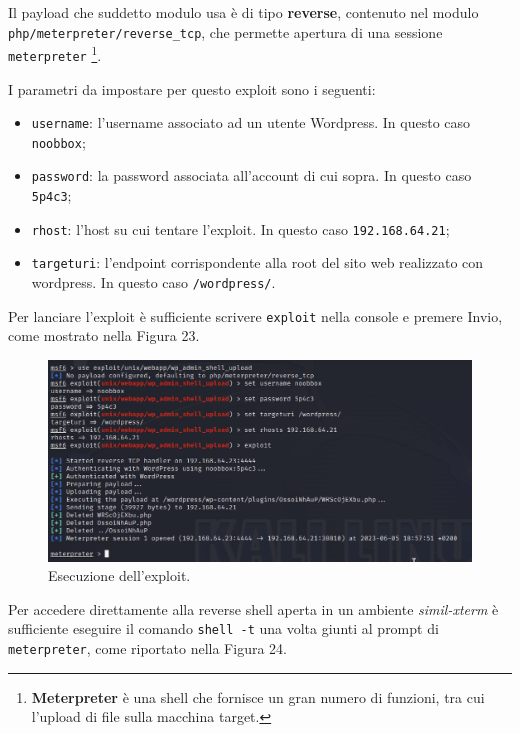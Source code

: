 \documentclass[a4paper, 12pt, oneside]{article}
\begin{document}
Il payload che suddetto modulo usa è di tipo \textbf{reverse}, contenuto nel modulo \texttt{php/meterpreter/reverse\_tcp}, che permette apertura di una sessione \texttt{meterpreter} \footnote{\textbf{Meterpreter} è una shell che fornisce un gran numero di funzioni, tra cui l'upload di file sulla macchina target.\cite{meterpreter}}.

I parametri da impostare per questo exploit sono i seguenti:

\begin{itemize}
    \item \texttt{username}: l'username associato ad un utente Wordpress. In questo caso \texttt{noobbox};
    \item \texttt{password}: la password associata all'account di cui sopra. In questo caso \texttt{5p4c3};
    \item \texttt{rhost}: l'host su cui tentare l'exploit. In questo caso \texttt{192.168.64.21};
    \item \texttt{targeturi}: l'endpoint corrispondente alla root del sito web realizzato con wordpress. In questo caso \texttt{/wordpress/}.
\end{itemize}

Per lanciare l'exploit è sufficiente scrivere \texttt{exploit} nella console e premere Invio, come mostrato nella Figura 23.

\begin{figure}[h!]
    \centering
    \includegraphics[width=\textwidth]{img/metaspolit_exploit.png}
    \caption{Esecuzione dell'exploit.}
\end{figure}

\newpage

Per accedere direttamente alla reverse shell aperta in un ambiente \textit{simil-xterm} è sufficiente eseguire il comando \texttt{shell -t} una volta giunti al prompt di \texttt{meterpreter}, come riportato nella Figura 24.
\end{document}
